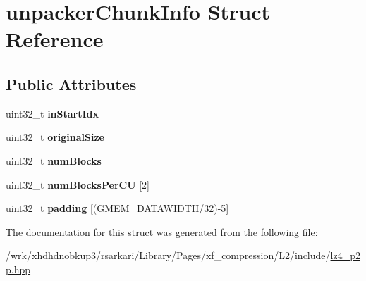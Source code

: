 \hypertarget{structunpackerChunkInfo}{\section{unpacker\-Chunk\-Info Struct Reference}
\label{structunpackerChunkInfo}
}
\subsection*{Public Attributes}
\begin{DoxyCompactItemize}
\item 
\hypertarget{structunpackerChunkInfo_ae0cfab878c9220194e5bd27d8cda4066}{uint32\-\_\-t {\bfseries in\-Start\-Idx}}\label{structunpackerChunkInfo_ae0cfab878c9220194e5bd27d8cda4066}

\item 
\hypertarget{structunpackerChunkInfo_ae0c63fe150a2862355abaa9105ccfa8b}{uint32\-\_\-t {\bfseries original\-Size}}\label{structunpackerChunkInfo_ae0c63fe150a2862355abaa9105ccfa8b}

\item 
\hypertarget{structunpackerChunkInfo_aa5dd30f0efca1cd503347e400f002d75}{uint32\-\_\-t {\bfseries num\-Blocks}}\label{structunpackerChunkInfo_aa5dd30f0efca1cd503347e400f002d75}

\item 
\hypertarget{structunpackerChunkInfo_aa298c12f402078e95acef4dfac17c1e1}{uint32\-\_\-t {\bfseries num\-Blocks\-Per\-C\-U} \mbox{[}2\mbox{]}}\label{structunpackerChunkInfo_aa298c12f402078e95acef4dfac17c1e1}

\item 
\hypertarget{structunpackerChunkInfo_a27ef665c9e23274a53566dc78e489dd9}{uint32\-\_\-t {\bfseries padding} \mbox{[}(G\-M\-E\-M\-\_\-\-D\-A\-T\-A\-W\-I\-D\-T\-H/32)-\/5\mbox{]}}\label{structunpackerChunkInfo_a27ef665c9e23274a53566dc78e489dd9}

\end{DoxyCompactItemize}


The documentation for this struct was generated from the following file\-:\begin{DoxyCompactItemize}
\item 
/wrk/xhdhdnobkup3/rsarkari/\-Library/\-Pages/xf\-\_\-compression/\-L2/include/\hyperlink{lz4__p2p_8hpp}{lz4\-\_\-p2p.\-hpp}\end{DoxyCompactItemize}
